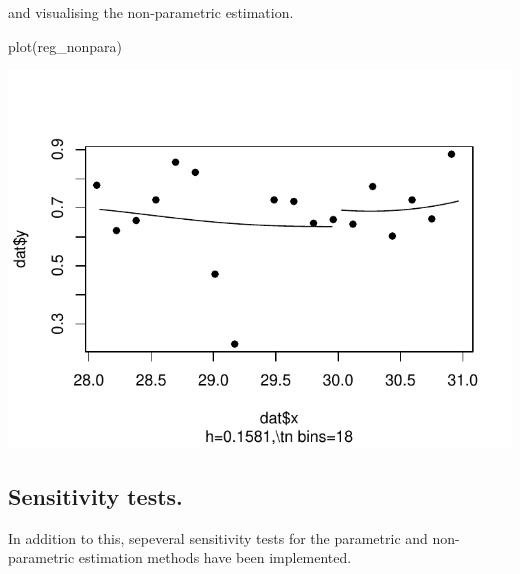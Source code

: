 \documentclass[article]{jss}
\begin{document}
and visualising the non-parametric estimation.

\begin{CodeChunk}
\begin{CodeInput}
plot(reg_nonpara)
\end{CodeInput}


\begin{center}\includegraphics{README_files/figure-latex/plot-reg_nonpara-1} \end{center}

\end{CodeChunk}

\subsection{Sensitivity tests.}\label{sensitivity-tests.}

In addition to this, sepeveral sensitivity tests for the parametric and
non-parametric estimation methods have been implemented.
\end{document}
